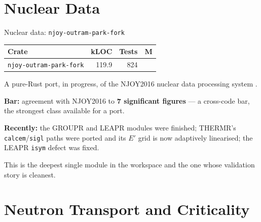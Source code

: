 \documentclass[aspectratio=169]{beamer}
\newcommand{\statustab}[1]{{\footnotesize\setlength{\tabcolsep}{4pt}#1}}
\begin{document}
\section{Nuclear Data}

\begin{frame}{Nuclear data: \texttt{njoy-outram-park-fork}}
    \statustab{
    \begin{tabular}{lrrc}
        \toprule
        \textbf{Crate} & \textbf{kLOC} & \textbf{Tests} & \textbf{M} \\
        \midrule
        \texttt{njoy-outram-park-fork} & 119.9 & 824 & \checkmark \\
        \bottomrule
    \end{tabular}}

    \medskip
    A pure-Rust port, in progress, of the NJOY2016 nuclear data processing
    system \parencite{macfarlane2017njoy}.

    \medskip
    \textbf{Bar:} agreement with NJOY2016 to \textbf{7 significant figures}
    --- a cross-code bar, the strongest class available for a port.

    \medskip
    \textbf{Recently:} the GROUPR and LEAPR modules were finished; THERMR's
    \texttt{calcem}/\texttt{sigl} paths were ported and its $E'$ grid is now
    adaptively linearised; the LEAPR \texttt{isym} defect was fixed.

    \medskip
    This is the deepest single module in the workspace and the one whose
    validation story is cleanest.
\end{frame}


\section{Neutron Transport and Criticality}
\end{document}
